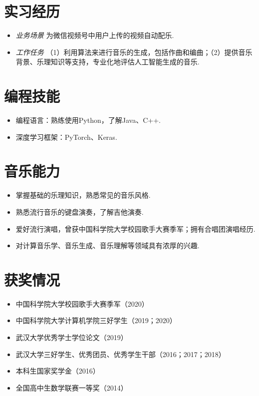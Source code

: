 \documentclass{resume}
\begin{document}
\section{实习经历}
{\small {}
}
\small
\begin{itemize}
  \item \textit{业务场景} \quad 为微信视频号中用户上传的视频自动配乐.
  \item \textit{工作任务} \quad （1）利用算法来进行音乐的生成，包括作曲和编曲；（2）提供音乐背景、乐理知识等支持，专业化地评估人工智能生成的音乐.
\end{itemize}

\section{编程技能}
\small
\begin{itemize}
  \item 编程语言：熟练使用Python，了解Java、C++.
  \item 深度学习框架：PyTorch、Keras.
\end{itemize}

\section{音乐能力}
\small
\begin{itemize}
  \item 掌握基础的乐理知识，熟悉常见的音乐风格.
  \item 熟悉流行音乐的键盘演奏，了解吉他演奏.
  \item 爱好流行演唱，曾获中国科学院大学校园歌手大赛季军；拥有合唱团演唱经历.
  \item 对计算音乐学、音乐生成、音乐理解等领域具有浓厚的兴趣. 
\end{itemize}

\section{获奖情况}
\begin{itemize}
  \item 中国科学院大学校园歌手大赛季军（2020）
  \item 中国科学院大学计算机学院三好学生（2019；2020）
  \item 武汉大学优秀学士学位论文（2019）
  \item 武汉大学三好学生、优秀团员、优秀学生干部（2016；2017；2018）
  \item 本科生国家奖学金（2016）
  \item 全国高中生数学联赛一等奖（2014）
\end{itemize}
\end{document}
